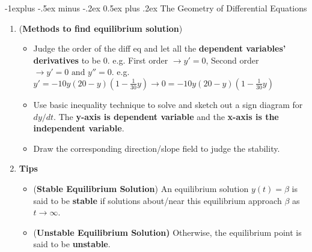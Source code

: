 \documentclass[10pt, landscape]{article}
\makeatletter
\renewcommand{\subsection}{\@startsection{subsection}{2}{0mm}%
                                {-1explus -.5ex minus -.2ex}%
                                {0.5ex plus .2ex}%
                                {\normalfont\normalsize\bfseries}}
\makeatother
\begin{document}
\begin{multicols}{4}
\subsection{The Geometry of Differential Equations}
\begin{enumerate}
    \item (\textbf{Methods to find equilibrium solution})
    \begin{itemize}
        \item Judge the order of the diff eq and let all the \textbf{dependent variables' derivatives} to be 0. e.g. First order $\rightarrow y'=0$, Second order $\rightarrow y'=0 \text{ and } y''=0$. e.g. $y'=-10y(20-y)(1-\frac{1}{30}y)\rightarrow 0=-10y(20-y)(1-\frac{1}{30}y)$
        \item Use basic inequality technique to solve and sketch out a sign diagram for $dy/dt$. The \textbf{y-axis is dependent variable} and the \textbf{x-axis is the independent variable}. %
        \item Draw the corresponding direction/slope field to judge the stability. %
    \end{itemize}
    \item \textbf{Tips}
    \begin{itemize}
        \item (\textbf{Stable Equilibrium Solution}) An equilibrium solution $y(t)=\beta$ is said to be \textbf{stable} if solutions about/near this equilibrium approach $\beta$ as $t\to \infty$.
        \item (\textbf{Unstable Equilibrium Solution)} Otherwise, the equilibrium point is said to be \textbf{unstable}.
    \end{itemize}
\end{enumerate}

\end{multicols}
\end{document}
